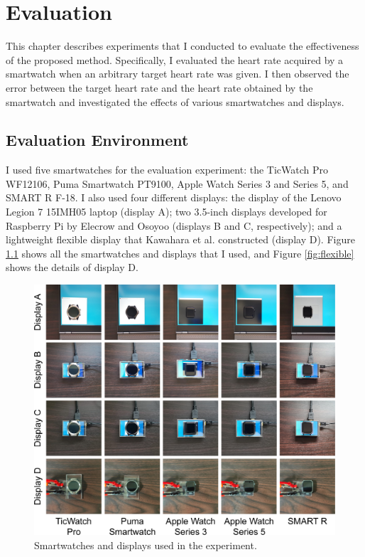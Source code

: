 \chapter{Evaluation}
\label{sec:evaluation}
This chapter describes experiments that I conducted to evaluate the effectiveness of the proposed method. Specifically, I evaluated the heart rate acquired by a smartwatch when an arbitrary target heart rate was given. I then observed the error between the target heart rate and the heart rate obtained by the smartwatch and investigated the effects of various smartwatches and displays.

\section{Evaluation Environment}
I used five smartwatches for the evaluation experiment: the TicWatch Pro WF12106, Puma Smartwatch PT9100, Apple Watch Series 3 and Series 5, and SMART R F-18. I also used four different displays: the display of the Lenovo Legion 7 15IMH05 laptop (display A); two 3.5-inch displays developed for Raspberry Pi by Elecrow and Osoyoo (displays B and C, respectively); and a lightweight flexible display \cite{flexible_display} that Kawahara et al. constructed (display D). Figure \ref{fig:smartwatches} shows all the smartwatches and displays that I used, and Figure \ref{fig:flexible} shows the details of display D.

\begin{figure}[!t]
  \centering
  \includegraphics[width=1\linewidth]{figures/smartwatches.eps}
  \caption{Smartwatches and displays used in the experiment.}
  \label{fig:smartwatches}
\end{figure}

